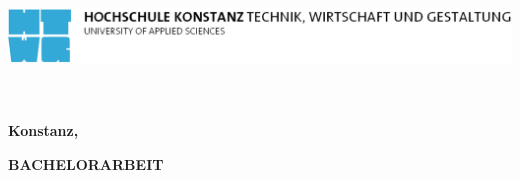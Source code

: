
\begin{titlepage}

\vspace*{-3.5cm}

\begin{flushleft}
\hspace*{-1cm} \includegraphics[width=15.7cm]{titlepages/htwg-logo}
\end{flushleft}

\vspace{2.5cm}

\begin{center}
	\huge{
		\textbf{\thema} \\[5cm]
	}
	\Large{
		\textbf{\autor}} \\[6.5cm]
	\large{
		\textbf{Konstanz, \abgabedatum} \\[2.3cm]
	}
	
	\Huge{
		\textbf{{\sf BACHELORARBEIT}}
	}
\end{center}

\end{titlepage}
